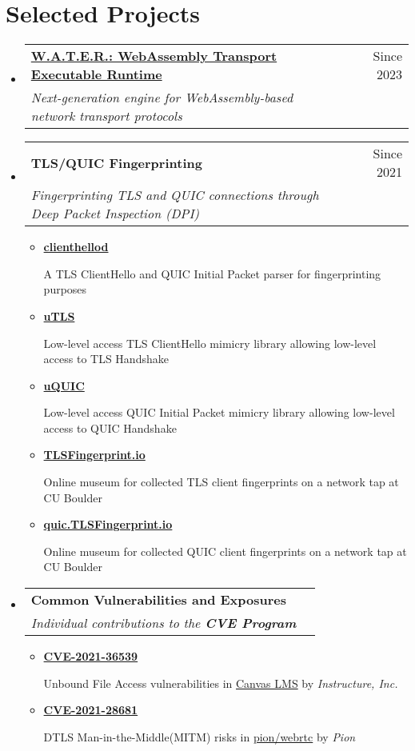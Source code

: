 \documentclass[letterpaper,11pt]{article}
\makeatletter
\newcommand{\resumeItem}[1]{
  \item\small{
    {#1 \vspace{-2pt}}
  }
}
\newcommand{\resumeSubheading}[4]{
  \vspace{-2pt}\item
    \begin{tabular*}{0.97\textwidth}[t]{l@{\extracolsep{\fill}}r}
      \textbf{#1} & #2 \\
      \textit{\small#3} & \textit{\small #4} \\
    \end{tabular*}\vspace{-7pt}
}
\newcommand{\resumeSubHeadingListStart}{\begin{itemize}[leftmargin=0.15in, label={}]}
\newcommand{\resumeSubHeadingListEnd}{\end{itemize}}
\newcommand{\resumeItemListStart}{\begin{itemize}}
\newcommand{\resumeItemListEnd}{\end{itemize}\vspace{-5pt}}
\makeatother
\begin{document}
\section{Selected Projects}
\resumeSubHeadingListStart
\resumeSubheading
{\href{https://github.com/gaukas/water}{\textbf{W.A.T.E.R.: WebAssembly Transport Executable Runtime}}}{Since 2023}
{Next-generation engine for WebAssembly-based network transport protocols}{}
\resumeSubheading
{\textbf{TLS/QUIC Fingerprinting}}{Since 2021}
{Fingerprinting TLS and QUIC connections through Deep Packet Inspection (DPI)}{}
\resumeItemListStart
  \resumeItem{\href{https://github.com/gaukas/clienthellod}{\textbf{clienthellod}}}
    {A TLS ClientHello and QUIC Initial Packet parser for fingerprinting purposes}
  \resumeItem{\href{https://github.com/refraction-networking/utls}{\textbf{uTLS}}}
    {Low-level access TLS ClientHello mimicry library allowing low-level access to TLS Handshake}
  \resumeItem{\href{https://github.com/refraction-networking/uquic}{\textbf{uQUIC}}}
    {Low-level access QUIC Initial Packet mimicry library allowing low-level access to QUIC Handshake}
  \resumeItem{\href{https://tlsfingerprint.io}{\textbf{TLSFingerprint.io}}}
    {Online museum for collected TLS client fingerprints on a network tap at CU Boulder}
  \resumeItem{\href{https://quic.tlsfingerprint.io}{\textbf{quic.TLSFingerprint.io}}}
    {Online museum for collected QUIC client fingerprints on a network tap at CU Boulder}  
\resumeItemListEnd
\resumeSubheading
{\textbf{Common Vulnerabilities and Exposures}}{}
{Individual contributions to the \textbf{CVE\textsuperscript{\textregistered} Program}}{}
\resumeItemListStart
  \resumeItem{\href{https://www.cve.org/CVERecord?id=CVE-2021-36539}{\textbf{CVE-2021-36539}}}
    {Unbound File Access vulnerabilities in \href{https://www.instructure.com/canvas}{Canvas LMS} by \emph{Instructure, Inc.}}
  \resumeItem{\href{https://www.cve.org/CVERecord?id=CVE-2021-28681}{\textbf{CVE-2021-28681}}}
    {DTLS Man-in-the-Middle(MITM) risks in \href{https://github.com/pion/webrtc}{pion/webrtc} by \emph{Pion}}
\resumeItemListEnd
\resumeSubHeadingListEnd
\vspace{1pt}

\end{document}
